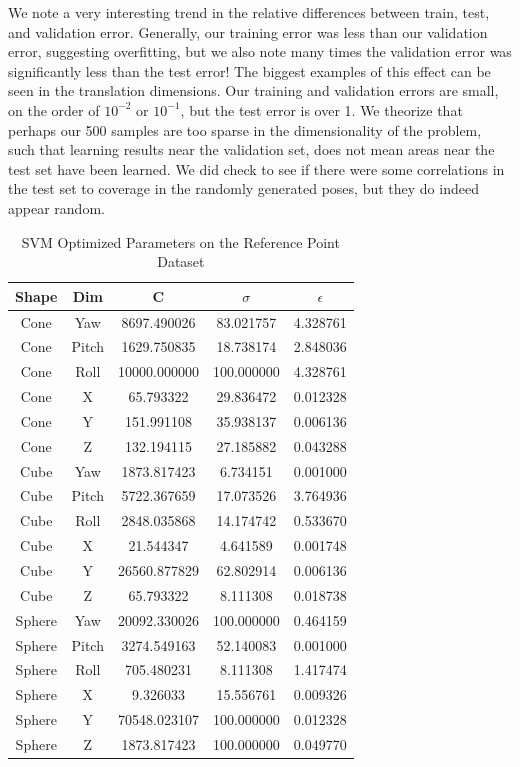 \documentclass[journal]{IEEEtran}
\begin{document}
We note a very interesting trend in the relative differences between train, test, and validation error. Generally, our training error was less than our validation error, suggesting overfitting, but we also note many times the validation error was significantly less than the test error! The biggest examples of this effect can be seen in the translation dimensions. Our training and validation errors are small, on the order of $10^{-2}$ or $10^{-1}$, but the test error is over 1. We theorize that perhaps our 500 samples are too sparse in the dimensionality of the problem, such that learning results near the validation set, does not mean areas near the test set have been learned. We did check to see if there were some correlations in the test set to coverage in the randomly generated poses, but they do indeed appear random.

\begin{table}[h]
\caption{SVM Optimized Parameters on the Reference Point Dataset}
\label{SVM_Point_Parms}
\centering

\begin{tabular}{|c|c|c|c|c|}
\hline
Shape & Dim & C & $\sigma$ & $\epsilon$\\
\hline
Cone & Yaw & 8697.490026 & 83.021757 & 4.328761\\
Cone & Pitch & 1629.750835 & 18.738174 & 2.848036\\
Cone & Roll & 10000.000000 & 100.000000 & 4.328761\\
Cone & X & 65.793322 & 29.836472 & 0.012328\\
Cone & Y & 151.991108 & 35.938137 & 0.006136\\
Cone & Z & 132.194115 & 27.185882 & 0.043288\\
\hline
Cube & Yaw & 1873.817423 & 6.734151 & 0.001000\\
Cube & Pitch & 5722.367659 & 17.073526 & 3.764936\\
Cube & Roll & 2848.035868 & 14.174742 & 0.533670\\
Cube & X & 21.544347 & 4.641589 & 0.001748\\
Cube & Y & 26560.877829 & 62.802914 & 0.006136\\
Cube & Z & 65.793322 & 8.111308 & 0.018738\\
\hline
Sphere &  Yaw & 20092.330026 & 100.000000 & 0.464159\\
Sphere &  Pitch & 3274.549163 & 52.140083 & 0.001000\\
Sphere &  Roll & 705.480231 & 8.111308 & 1.417474\\
Sphere &  X & 9.326033 & 15.556761 & 0.009326\\
Sphere &  Y & 70548.023107 & 100.000000 & 0.012328\\
Sphere &  Z & 1873.817423 & 100.000000 & 0.049770\\
\hline
\end{tabular}
\end{table}
\end{document}
